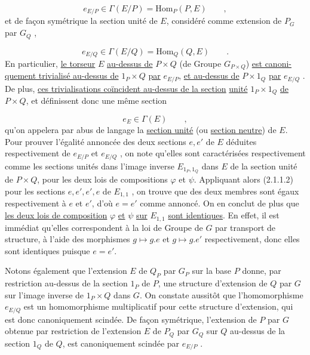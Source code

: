 \begin{equation}\tag{2.2.1}
e_{E/P} \in \Gamma(E/P) = \mathrm{Hom}_P(P,E) \qquad ,
\end{equation}
et de façon symétrique la section unité de $E$, considéré comme extension
de $P_G$ par $G_Q$ ,

\begin{equation}\tag{2.2.2}
e_{E/Q} \in \Gamma(E/Q) = \mathrm{Hom}_Q(Q,E) \qquad .
\end{equation}
En particulier, \underline{le torseur} $E$ \underline{au-dessus de} $P\times Q$ (de Groupe $G_{P\times Q}$) \underline{est canoni-}
\underline{quement trivialisé au-dessus de} $1_P\times Q$ \underline{par} $e_{E/P}$, \underline{et au-dessus de} $P \times 1_Q$ \underline{par}
$e_{E/Q}$ . De plus, \underline{ces trivialisations coïncident au-dessus de la section}
\underline{unité} $1_P\times 1_Q$ \underline{de} $P\times Q$, et définissent donc une même section 


\begin{equation}\tag{2.2.3}
 e_{E} \in \Gamma(E) \qquad ,
\end{equation}
qu'on appelera par abus de langage la \underline{section unité} (ou \underline{section neutre}) de $E$. Pour prouver l'égalité annoncée des deux sections $e,e'$ de $E$ déduites respectivement de $e_{E/P}$ et $e_{E/Q}$ , on note qu'elles sont caractérisées respectivement comme les sections unités dans l'image inverse $E_{1_{P},1_{Q}}$ dans $E$ de la section unité de $P\times Q$, pour les deux lois de compositions $\varphi$ et $\psi$. Appliquant alors (2.1.1.2) pour les sections $e,e',e',e$ de $E_{1,1}$ , on trouve que des deux membres sont égaux respectivement à $e$ et $e'$, d'où $e=e'$ comme annoncé. On en conclut de plus que \underline{les deux lois de composition} $\varphi$ \underline{et} $\psi$ \underline{sur} $E_{1,1}$ \underline{sont identiques}. En effet, il est immédiat qu'elles correspondent à la loi de Groupe de $G$ par transport de structure, à l'aide des morphismes $g \longmapsto g.e$ et $g \longmapsto g.e'$ respectivement, donc elles sont identiques puisque $e=e'$.

Notons également que l'extension $E$ de $Q_{P}$ par $G_{P}$ sur la base $P$ donne, par restriction au-dessus de la section $1_{P}$ de $P$, une structure d'extension de $Q$ par $G$ sur l'image inverse de $1_{P}\times Q$ dans $G$. On constate aussitôt que l'homomorphisme $e_{E/Q}$ est un homomorphisme multiplicatif pour cette structure d'extension, qui est donc canoniquement scindée. De façon symétrique, l'extension de $P$ par $G$ obtenue par restriction de l'extension $E$ de $P_{Q}$ par $G_{Q}$ sur $Q$ au-dessus de la section $1_{Q}$ de $Q$, est canoniquement scindée par $e_{E/P}$ .



